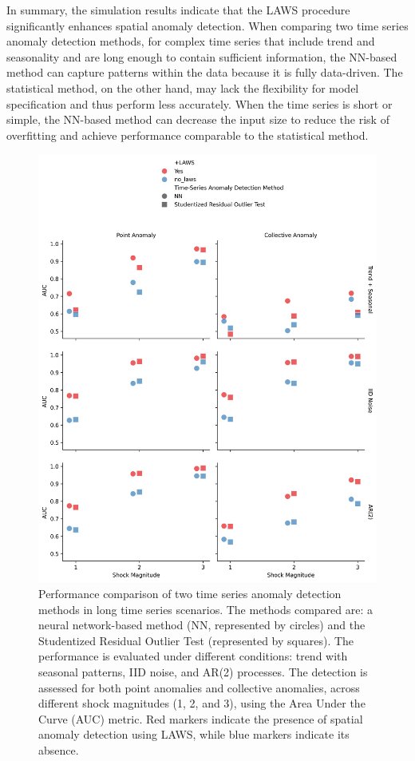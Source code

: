 \documentclass[11pt]{article}
\begin{document}
In summary, the simulation results indicate that the LAWS procedure significantly enhances spatial anomaly detection. When comparing two time series anomaly detection methods, for complex time series that include trend and seasonality and are long enough to contain sufficient information, the NN-based method can capture patterns within the data because it is fully data-driven. The statistical method, on the other hand, may lack the flexibility for model specification and thus perform less accurately. When the time series is short or simple, the NN-based method can decrease the input size to reduce the risk of overfitting and achieve performance comparable to the statistical method.



\begin{figure}[h]
    \centering
    \includegraphics[width=\textwidth]{../figure/simulation_long_time_series.png}
    \caption{Performance comparison of two time series anomaly detection methods in long time series scenarios. The methods compared are: a neural network-based method (NN, represented by circles) and the Studentized Residual Outlier Test (represented by squares). The performance is evaluated under different conditions: trend with seasonal patterns, IID noise, and AR(2) processes. The detection is assessed for both point anomalies and collective anomalies, across different shock magnitudes (1, 2, and 3), using the Area Under the Curve (AUC) metric. Red markers indicate the presence of spatial anomaly detection using LAWS, while blue markers indicate its absence.}
    \label{fig: simulation long time series}
\end{figure}
\end{document}
